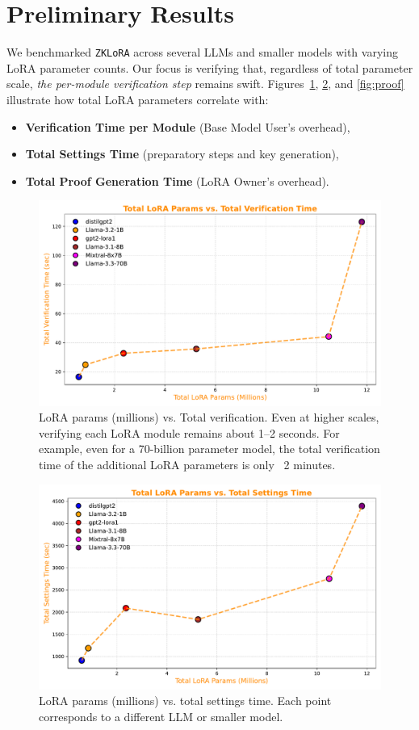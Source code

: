 \documentclass[11pt]{article}
\begin{document}
\section{Preliminary Results}

We benchmarked \texttt{ZKLoRA} across several LLMs and smaller models with varying LoRA parameter counts. Our focus is verifying that, regardless of total parameter scale, \emph{the per-module verification step} remains swift. 
Figures~\ref{fig:verify}, \ref{fig:settings}, and \ref{fig:proof} illustrate how total LoRA parameters correlate with:
\begin{itemize}
    \item \textbf{Verification Time per Module} (Base Model User’s overhead),
    \item \textbf{Total Settings Time} (preparatory steps and key generation),
    \item \textbf{Total Proof Generation Time} (LoRA Owner’s overhead).
\end{itemize}

\begin{figure}[ht]
    \centering
    \includegraphics[width=0.58\linewidth]{figs/fig_verify.pdf}
    \caption{LoRA params (millions) vs. Total verification. Even at higher scales, verifying each LoRA module remains about 1--2 seconds. For example, even for a 70-billion parameter model, the total verification time of the additional LoRA parameters is only ~2 minutes.}
    \label{fig:verify}
\end{figure}

\begin{figure}[ht]
    \centering
    \includegraphics[width=0.58\linewidth]{figs/fig_settings.pdf}
    \caption{LoRA params (millions) vs. total settings time. Each point corresponds to a different LLM or smaller model.}
    \label{fig:settings}
\end{figure}
\end{document}
